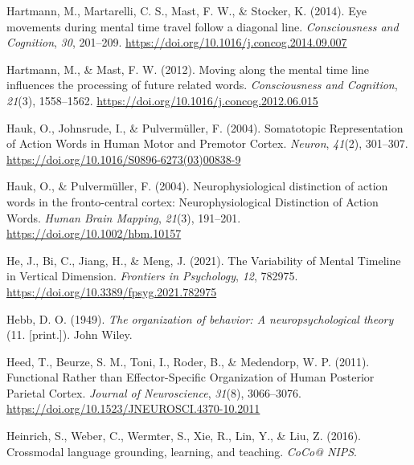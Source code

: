 \documentclass[
  a4paper,12pt,twoside,onecolumn,openright,final,oldfontcommands]{memoir}
\newlength{\cslhangindent}
\newlength{\cslentryspacingunit} %
\newenvironment{CSLReferences}[2] %
 {%
  \setlength{\parindent}{0pt}
  \ifodd #1
  \let\oldpar\par
  \def\par{\hangindent=\cslhangindent\oldpar}
  \fi
  \setlength{\parskip}{#2\cslentryspacingunit}
 }%
 {}
\begin{document}
\begin{CSLReferences}{1}{0}
\leavevmode{}%
Hartmann, M., Martarelli, C. S., Mast, F. W., \& Stocker, K. (2014). Eye movements during mental time travel follow a diagonal line. \emph{Consciousness and Cognition}, \emph{30}, 201--209. \url{https://doi.org/10.1016/j.concog.2014.09.007}

\leavevmode{}%
Hartmann, M., \& Mast, F. W. (2012). Moving along the mental time line influences the processing of future related words. \emph{Consciousness and Cognition}, \emph{21}(3), 1558--1562. \url{https://doi.org/10.1016/j.concog.2012.06.015}

\leavevmode{}%
Hauk, O., Johnsrude, I., \& Pulvermüller, F. (2004). Somatotopic {Representation} of {Action} {Words} in {Human} {Motor} and {Premotor} {Cortex}. \emph{Neuron}, \emph{41}(2), 301--307. \url{https://doi.org/10.1016/S0896-6273(03)00838-9}

\leavevmode{}%
Hauk, O., \& Pulvermüller, F. (2004). Neurophysiological distinction of action words in the fronto-central cortex: {Neurophysiological} {Distinction} of {Action} {Words}. \emph{Human Brain Mapping}, \emph{21}(3), 191--201. \url{https://doi.org/10.1002/hbm.10157}

\leavevmode{}%
He, J., Bi, C., Jiang, H., \& Meng, J. (2021). The {Variability} of {Mental} {Timeline} in {Vertical} {Dimension}. \emph{Frontiers in Psychology}, \emph{12}, 782975. \url{https://doi.org/10.3389/fpsyg.2021.782975}

\leavevmode{}%
Hebb, D. O. (1949). \emph{The organization of behavior: A neuropsychological theory} (11. {[}print.{]}). John Wiley.

\leavevmode{}%
Heed, T., Beurze, S. M., Toni, I., Roder, B., \& Medendorp, W. P. (2011). Functional {Rather} than {Effector}-{Specific} {Organization} of {Human} {Posterior} {Parietal} {Cortex}. \emph{Journal of Neuroscience}, \emph{31}(8), 3066--3076. \url{https://doi.org/10.1523/JNEUROSCI.4370-10.2011}

\leavevmode{}%
Heinrich, S., Weber, C., Wermter, S., Xie, R., Lin, Y., \& Liu, Z. (2016). Crossmodal language grounding, learning, and teaching. \emph{{CoCo}@ {NIPS}}.


\end{CSLReferences}
\end{document}
